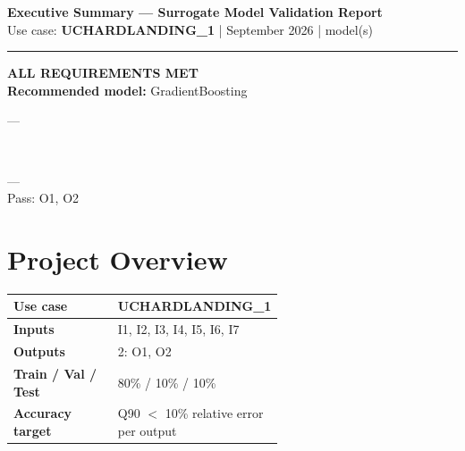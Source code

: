 \documentclass[9pt,a4paper]{article}
\begin{document}
\thispagestyle{fancy}

\begin{center}
  {\large\bfseries\color{primary} Executive Summary --- Surrogate Model Validation Report}\\[2pt]
  {\small\color{sepgray} Use case: \textbf{UCHARDLANDING\_1} \quad| September 2026 \quad| model(s)}
\end{center}
\vspace{-4pt}\noindent\rule{\linewidth}{1pt}\vspace{3pt}

\begin{center}
\colorbox{passgreen}{\begin{minipage}{0.66\linewidth}
  \vspace{5pt}\centering
  {\normalsize\bfseries ALL REQUIREMENTS MET}\\[4pt]
  {\small\bfseries Recommended model:} {\small GradientBoosting}\\[5pt]
\colorbox{r2green}{\begin{minipage}{0.97\linewidth}\vspace{2pt} \enspace---\vspace{2pt}\end{minipage}}\\[2pt]
\colorbox{passgreen}{\begin{minipage}{0.97\linewidth}\vspace{2pt} \enspace---\\[1pt]{\footnotesize Pass: O1, O2}\vspace{2pt}\end{minipage}}
  \vspace{5pt}
\end{minipage}}
\end{center}

\section{Project Overview}
\renewcommand{\arraystretch}{1.2}
\begin{tabular}{|l|p{0.60\linewidth}|}
  \hline
  \textbf{Use case}           & UCHARDLANDING\_1 \\ \hline
  \textbf{Inputs}             & I1, I2, I3, I4, I5, I6, I7 \\ \hline
  \textbf{Outputs}            & 2: O1, O2 \\ \hline
  \textbf{Train / Val / Test} & 80\% / 10\% / 10\% \\ \hline
  \textbf{Accuracy target}    & Q90 $<$ 10\% relative error per output \\ \hline
\end{tabular}
\end{document}
